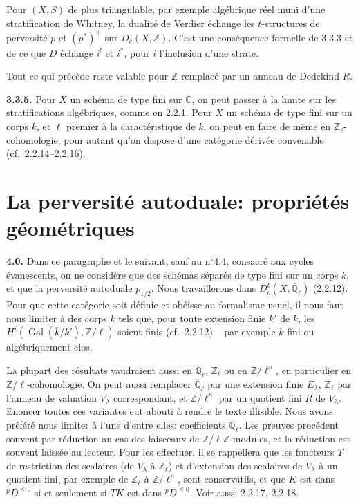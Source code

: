 \documentclass[12pt,a4paper]{article}
\theoremstyle{plain}
\theoremstyle{definition}
\DeclareMathOperator{\Gal}{Gal}
\providecommand{\Gal}{\operatorname{Gal}}
\begin{document}
Pour $(X,S)$ de plus triangulable, par exemple alg\'{e}brique r\'{e}el muni d'une stratification de Whitney, la dualit\'{e} de Verdier \'{e}change les $t$-structures de perversit\'{e} $p$ et $(p^{*})^{+}$ sur $D_{c}(X,\mathbb{Z})$. C'est une cons\'{e}quence formelle de 3.3.3 et de ce que $D$ \'{e}change $i^{!}$ et $i^{*}$, pour $i$ l'inclusion d'une strate.

Tout ce qui pr\'{e}c\`{e}de reste valable pour $\mathbb{Z}$ remplac\'{e} par un anneau de Dedekind $R$.

\noindent\textbf{3.3.5.} Pour $X$ un sch\'{e}ma de type fini sur $\mathbb{C}$, on peut passer \`{a} la limite sur les stratifications alg\'{e}briques, comme en 2.2.1. Pour $X$ un sch\'{e}ma de type fini sur un corps $k$, et $\ell$ premier \`{a} la caract\'{e}ristique de $k$, on peut en faire de m\^{e}me en $\mathbb{Z}_{\ell}$-cohomologie, pour autant qu'on dispose d'une cat\'{e}gorie d\'{e}riv\'{e}e convenable (cf.\ 2.2.14--2.2.16).


\section{La perversit\'{e} autoduale: propri\'{e}t\'{e}s g\'{e}om\'{e}triques}

\noindent\textbf{4.0.} Dans ce paragraphe et le suivant, sauf au n$^{\circ}$4.4, consacr\'{e} aux cycles \'{e}vanescents, on ne consid\`{e}re que des sch\'{e}mas s\'{e}par\'{e}s de type fini sur un corps $k$, et que la perversit\'{e} autoduale $p_{1/2}$. Nous travaillerons dans $D_{c}^{b}(X,\overline{\mathbb{Q}}_{\ell})$ (2.2.12). Pour que cette cat\'{e}gorie soit d\'{e}finie et ob\'{e}isse au formalisme usuel, il nous faut nous limiter \`{a} des corps $k$ tels que, pour toute extension finie $k'$ de $k$, les $H^{i}(\Gal(\overline{k}/k'), \mathbb{Z}/\ell)$ soient finis (cf.\ 2.2.12) -- par exemple $k$ fini ou alg\'{e}briquement clos.

La plupart des r\'{e}sultats vaudraient aussi en $\mathbb{Q}_{\ell}$, $\mathbb{Z}_{\ell}$ ou en $\mathbb{Z}/\ell^{n}$, en particulier en $\mathbb{Z}/\ell$-cohomologie. On peut aussi remplacer $\overline{\mathbb{Q}}_{\ell}$ par une extension finie $E_{\lambda}$, $\mathbb{Z}_{\ell}$ par l'anneau de valuation $V_{\lambda}$ correspondant, et $\mathbb{Z}/\ell^{n}$ par un quotient fini $R$ de $V_{\lambda}$. Enoncer toutes ces variantes eut abouti \`{a} rendre le texte illisible. Nous avons pr\'{e}f\'{e}r\'{e} nous limiter \`{a} l'une d'entre elles: coefficients $\overline{\mathbb{Q}}_{\ell}$. Les preuves proc\'{e}dent souvent par r\'{e}duction au cas des faisceaux de $\mathbb{Z}/\ell\mathbb{Z}$-modules, et la r\'{e}duction est souvent laiss\'{e}e au lecteur. Pour les effectuer, il se rappellera que les foncteurs $T$ de restriction des scalaires (de $V_{\lambda}$ \`{a} $\mathbb{Z}_{\ell}$) et d'extension des scalaires de $V_{\lambda}$ \`{a} un quotient fini, par exemple de $\mathbb{Z}_{\ell}$ \`{a} $\mathbb{Z}/\ell^{n}$, sont conservatifs, et que $K$ est dans ${}^{p}D^{\leq 0}$ si et seulement si $TK$ est dans ${}^{p}D^{\leq 0}$. Voir aussi 2.2.17, 2.2.18.
\end{document}
